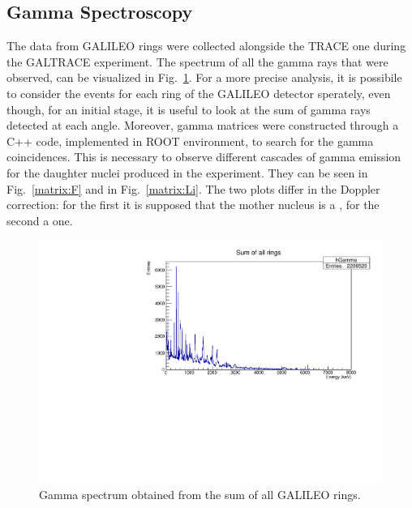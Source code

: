 \subsection{Gamma Spectroscopy}\label{gammaspectr}

The data from GALILEO rings were collected alongside the TRACE one during the
GALTRACE experiment. The spectrum of all the gamma rays that were observed,
can be visualized in Fig.~\ref{gamma}.
For a more precise analysis, it is possibile to consider the events for each
ring of the GALILEO detector sperately, even though, for an initial stage,
it is useful to look at the sum of gamma rays detected at each angle.
Moreover, gamma matrices were constructed through a C++ code,
implemented in ROOT environment, to search for the gamma coincidences.
This is necessary to observe different cascades of gamma emission for the
daughter nuclei produced in the experiment.
They can be seen in Fig.~\ref{matrix:F} and in Fig.~\ref{matrix:Li}.
The two plots differ in the Doppler correction: for the first it is supposed
that the mother nucleus is a , for the second a  one.

\begin{figure}[h]
  \centering
  \includegraphics[scale=.6]{img/gamma.pdf}
  \caption{Gamma spectrum obtained from the sum of all GALILEO rings.}
  \label{gamma}
\end{figure}

